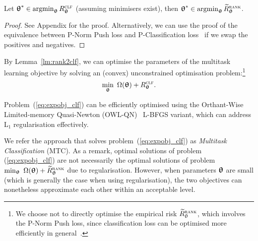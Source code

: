 \begin{lemma}
\label{lm:rank2clf}
Let ${\bm{\uptheta}}^* \in \operatorname*{argmin}_{{\bm{\uptheta}}} R_{{\bm{\uptheta}}}^{\textsc{clf}}$ (assuming minimisers exist),
then ${\bm{\uptheta}}^* \in \operatorname*{argmin}_{{\bm{\uptheta}}} \widetilde R_{{\bm{\uptheta}}}^{\textsc{rank}}$.
\end{lemma}

\begin{proof}
See Appendix for the proof.
Alternatively, 
we can use the proof of the equivalence between P-Norm Push loss and P-Classification loss~\cite{ertekin2011equivalence}
if we swap the positives and negatives.
\end{proof}


By Lemma~\ref{lm:rank2clf}, %
we can optimise the parameters of the multitask learning objective by 
solving an (convex) unconstrained optimisation problem:\footnote{We choose not to directly optimise 
the empirical risk $\widetilde R_{\uptheta}^{\textsc{rank}}$, which involves the P-Norm Push loss, %
since classification loss can be optimised more efficiently in general~\cite{ertekin2011equivalence}.}
\begin{equation}
\label{eq:expobj_clf}
\min_{\bm{\uptheta}} \ \Omega({\bm{\uptheta}}) + R_{{\bm{\uptheta}}}^{\textsc{clf}}.
\end{equation}

Problem~(\ref{eq:expobj_clf}) can be efficiently optimised using the
Orthant-Wise Limited-memory Quasi-Newton (OWL-QN)~\cite{andrew2007scalable} L-BFGS variant,
which can address L$_1$ regularisation effectively.

We refer the approach that solves problem~(\ref{eq:expobj_clf}) as \emph{Multitask Classification} (MTC). %
As a remark, optimal solutions of problem (\ref{eq:expobj_clf}) are not necessarily the optimal solutions 
of problem $\min_{\bm{\uptheta}} \ \Omega({\bm{\uptheta}}) + \widetilde R_{{\bm{\uptheta}}}^{\textsc{rank}}$ due to regularisation. %
However, when parameters ${\bm{\uptheta}}$ are small (which is generally the case when using regularisation), the two objectives 
can nonetheless approximate each other within an acceptable level.


